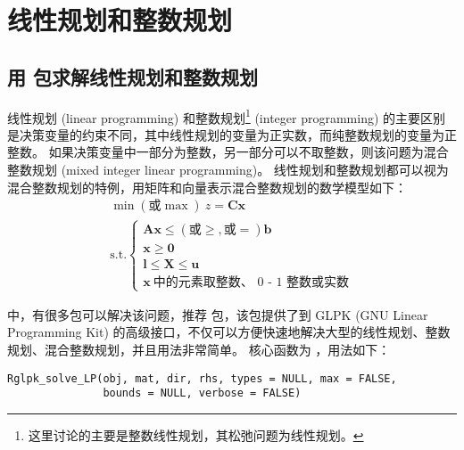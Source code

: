  \section{线性规划和整数规划}
 \subsection{用  包求解线性规划和整数规划}
 线性规划 (linear programming) 和整数规划\footnote{这里讨论的主要是整数线性规划，其松弛问题为线性规划。}
  (integer programming) 的主要区别是决策变量的约束不同，其中线性规划的变量为正实数，而纯整数规划的变量为正整数。
 如果决策变量中一部分为整数，另一部分可以不取整数，则该问题为混合整数规划 (mixed integer linear programming)。
 线性规划和整数规划都可以视为混合整数规划的特例，用矩阵和向量表示混合整数规划的数学模型如下：
  \begin{equation}\label{eq:lpip}
\begin{array}{l}
 \min(\text{或}\max) \ z=\mathbf{Cx}  \\
 \text{s.t.}\left\{ \begin{array}{l}
   \mathbf{Ax}\leqslant (\text{或}\geqslant, \text{或}=) \mathbf{b}\\
   \mathbf{x}\geqslant \mathbf{0}\\
   \mathbf{l} \leqslant \mathbf{X} \leqslant \mathbf{u}\\
   \mathbf{x}\ \text{中的元素取整数、 0 - 1 整数或实数}
 \end{array} \right.
 \end{array}
\end{equation}

\R 中，有很多包可以解决该问题，推荐  包\citep{Rglpk08}，该包提供了到 GLPK (GNU Linear Programming Kit) 
的高级接口，不仅可以方便快速地解决大型的线性规划、整数规划、混合整数规划，并且用法非常简单。
核心函数为 ，用法如下：

\begin{verbatim}
Rglpk_solve_LP(obj, mat, dir, rhs, types = NULL, max = FALSE,
               bounds = NULL, verbose = FALSE)
\end{verbatim}

